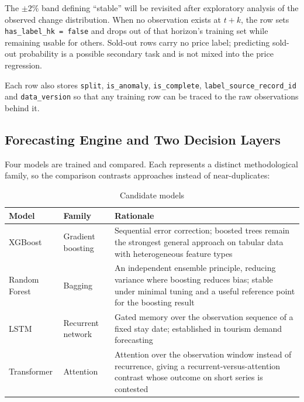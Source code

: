 The $\pm 2\%$ band defining ``stable'' will be revisited after exploratory analysis of the observed change distribution. When no observation exists at $t+k$, the row sets \texttt{has\_label\_hk = false} and drops out of that horizon's training set while remaining usable for others. Sold-out rows carry no price label; predicting sold-out probability is a possible secondary task and is not mixed into the price regression.

Each row also stores \texttt{split}, \texttt{is\_anomaly}, \texttt{is\_complete}, \texttt{label\_source\_record\_id} and \texttt{data\_version} so that any training row can be traced to the raw observations behind it.

\subsection{Forecasting Engine and Two Decision Layers}

Four models are trained and compared. Each represents a distinct methodological family, so the comparison contrasts approaches instead of near-duplicates:

\begin{table}[!htbp]
\centering
\caption{Candidate models}
\label{tab:models}
\begin{tabular}{|p{3.0cm}|p{2.8cm}|p{7.6cm}|}
\hline
\textbf{Model} & \textbf{Family} & \textbf{Rationale} \\
\hline
XGBoost \cite{chen2016} & Gradient boosting & Sequential error correction; boosted trees remain the strongest general approach on tabular data with heterogeneous feature types \cite{grinsztajn2022} \\
\hline
Random Forest \cite{breiman2001} & Bagging & An independent ensemble principle, reducing variance where boosting reduces bias; stable under minimal tuning and a useful reference point for the boosting result \\
\hline
LSTM \cite{hochreiter1997} & Recurrent network & Gated memory over the observation sequence of a fixed stay date; established in tourism demand forecasting \cite{law2019} \\
\hline
Transformer \cite{vaswani2017} & Attention & Attention over the observation window instead of recurrence, giving a recurrent-versus-attention contrast whose outcome on short series is contested \cite{zeng2023} \\
\hline
\end{tabular}
\end{table}

